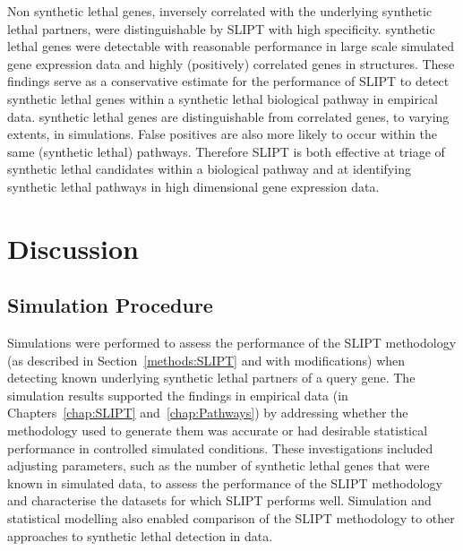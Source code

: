 Non synthetic lethal genes, inversely correlated with the underlying \gls{synthetic lethal} partners, were distinguishable by \gls{SLIPT} with high specificity. \Gls{synthetic lethal} genes were detectable with reasonable performance in large scale simulated \gls{gene expression} data and highly (positively) correlated genes in  structures. These findings serve as a conservative estimate for the performance of \gls{SLIPT} to detect \gls{synthetic lethal} genes within a \gls{synthetic lethal} biological pathway in empirical data. \Gls{synthetic lethal} genes are distinguishable from correlated genes, to varying extents, in simulations. False positives are also more likely to occur within the same (synthetic lethal) pathways. Therefore \gls{SLIPT} is both effective at triage of \gls{synthetic lethal} candidates within a biological pathway and at identifying \gls{synthetic lethal} pathways in high dimensional \gls{gene expression} data.


\FloatBarrier

\section{Discussion}

\subsection{Simulation Procedure}

Simulations were performed to assess the performance of the \gls{SLIPT} methodology (as described in Section~\ref{methods:SLIPT} and with modifications) when detecting known underlying \gls{synthetic lethal} partners of a query gene. The simulation results supported the findings in empirical data (in Chapters~\ref{chap:SLIPT} and~\ref{chap:Pathways}) by addressing whether the methodology used to generate them was accurate or had desirable statistical performance in controlled simulated conditions. These investigations included adjusting parameters, such as the number of \gls{synthetic lethal} genes that were known in simulated data, to assess the performance of the \gls{SLIPT} methodology and characterise the datasets for which \gls{SLIPT} performs well. Simulation and statistical modelling also enabled comparison of the \gls{SLIPT} methodology to other approaches to \gls{synthetic lethal} detection in  data.


